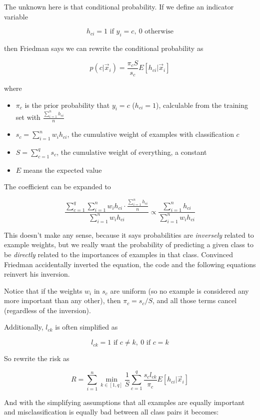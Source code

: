 \documentclass[12pt]{article}
\begin{document}
The unknown here is that conditional probability. If we define an indicator variable

$$h_{ci} = 1 \text{ if } y_i=c,\ 0 \text{ otherwise}$$

then Friedman says we can rewrite the conditional probability as

$$p(c | \vec{x}_i) = \frac{\pi_c S}{s_c} E[h_{ci} | \vec{x}_i]$$

where
\begin{itemize}
	\setlength\itemsep{-2mm}
	\item $\pi_c$ is the prior probability that $y_i=c$ ($h_{ci}=1$), calculable from the training set with $\frac{\sum_{i=1}^n h_{ci}}{n}$
	\item $s_c = \sum_{i=1}^n w_i h_{ci}$, the cumulative weight of examples with classification $c$
	\item $S = \sum_{c=1}^q s_c$, the cumulative weight of everything, a constant
	\item $E$ means the expected value
\end{itemize}

The coefficient can be expanded to

$$\frac{\sum_{c=1}^q \sum_{i=1}^n w_i h_{ci} \cdot \frac{\sum_{i=1}^n h_{ci}}{n}}{\sum_{i=1}^n w_i h_{ci}} \propto \frac{\sum_{i=1}^n h_{ci}}{\sum_{i=1}^n w_i h_{ci}}$$

This doesn't make any sense, because it says probabilities are \textit{inversely} related to example weights, but we really want the probability of predicting a given class to be \textit{directly} related to the importances of examples in that class. Convinced Friedman accidentally inverted the equation, the code and the following equations reinvert his inversion.

Notice that if the weights $w_i$ in $s_c$ are uniform (so no example is considered any more important than any other), then $\pi_c = s_c/S$, and all those terms cancel (regardless of the inversion).

Additionally, $l_{ck}$ is often simplified as

$$l_{ck} = 1 \text{ if } c \neq k,\ 0 \text{ if } c=k$$

So rewrite the risk as

$$R = \sum_{i=1}^n \min_{k \in [1,q]} \frac{1}{S} \sum_{c=1}^q \frac{s_c l_{ck}}{\pi_c} E[h_{ci} | \vec{x}_i]$$

And with the simplifying assumptions that all examples are equally important and misclassification is equally bad between all class pairs it becomes:
\end{document}
